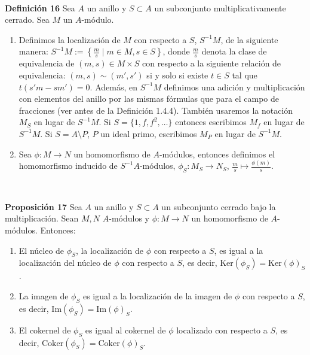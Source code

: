 \documentclass[10pt,a4paper]{article}
\begin{document}
\begin{enumerate}[label=(\alph*)]
\

\textbf{Definición 16}
Sea \( A \) un anillo y \( S \subset A \) un subconjunto multiplicativamente cerrado. Sea \( M \) un \( A \)-módulo.

\begin{enumerate}
    \item Definimos la localización de \( M \) con respecto a \( S \), \( S^{-1}M \), de la siguiente manera:
    \( S^{-1}M := \left\{ \frac{m}{s} \mid m \in M, s \in S \right\} \),
    donde \( \frac{m}{s} \) denota la clase de equivalencia de \( (m, s) \in M \times S \) con respecto a la siguiente relación de equivalencia:
    \( (m, s) \sim (m', s') \) si y solo si existe \( t \in S \) tal que \( t(s'm - sm') = 0 \).
    Además, en \( S^{-1}M \) definimos una adición y multiplicación con elementos del anillo por las mismas fórmulas que para el campo de fracciones (ver antes de la Definición 1.4.4). También usaremos la notación \( M_S \) en lugar de \( S^{-1}M \). Si \( S = \{1, f, f^2, \ldots\} \) entonces escribimos \( M_f \) en lugar de \( S^{-1}M \). Si \( S = A \setminus P \), \( P \) un ideal primo, escribimos \( M_P \) en lugar de \( S^{-1}M \).

    \item Sea \( \phi: M \rightarrow N \) un homomorfismo de \( A \)-módulos, entonces definimos el homomorfismo inducido de \( S^{-1}A \)-módulos,
    \( \phi_S: M_S \rightarrow N_S \), \( \frac{m}{s} \mapsto \frac{\phi(m)}{s} \).
    
\end{enumerate}

\

\textbf{Proposición 17}
Sea \( A \) un anillo y \( S \subset A \) un subconjunto cerrado bajo la multiplicación. Sean \( M, N \) \( A \)-módulos y \( \phi: M \rightarrow N \) un homomorfismo de \( A \)-módulos. Entonces:

\begin{enumerate}
    \item El núcleo de \( \phi_S \), la localización de \( \phi \) con respecto a \( S \), es igual a la localización del núcleo de \( \phi \) con respecto a \( S \), es decir, \( \text{Ker}(\phi_S) = \text{Ker}(\phi)_S \).
    \item La imagen de \( \phi_S \) es igual a la localización de la imagen de \( \phi \) con respecto a \( S \), es decir, \( \text{Im}(\phi_S) = \text{Im}(\phi)_S \).
    \item El cokernel de \( \phi_S \) es igual al cokernel de \( \phi \) localizado con respecto a \( S \), es decir, \( \text{Coker}(\phi_S) = \text{Coker}(\phi)_S \).
\end{enumerate}


\end{enumerate}
\end{document}
